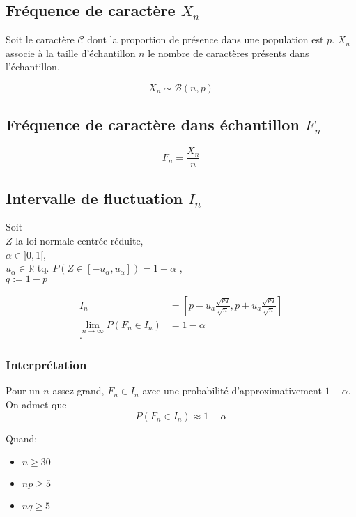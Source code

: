 \documentclass{article}
\newcommand{\R}{\mathds{R}}
\begin{document}
\subsection{Fréquence de caractère $X_{n}$}
Soit le caractère $\mathcal{C}$ dont la proportion de présence dans une population est $p$.
$X_{n}$ associe à la taille d'échantillon $n$ le nombre de caractères présents dans l'échantillon.

\[
	X_{n} \sim \mathcal{B}(n, p) 
\]

\subsection{Fréquence de caractère dans échantillon $F_{n}$}

\[
	F_{n} = \frac{X_{n}}{n}
\]

\subsection{Intervalle de fluctuation $I_n$}

Soit \\ $Z$ la loi normale centrée réduite, \\
$\alpha \in ]0, 1[$, \\
$u_{\alpha} \in \R$ tq. $P(Z \in [-u_{\alpha}, u_{\alpha}]) = 1 - \alpha$ ,\\
$q := 1-p$

\begin{align*}
	I_n &= \left[ p - u_{a} \frac{\sqrt{pq} }{\sqrt{n} }, p+u_{a} \frac{\sqrt{pq} }{\sqrt{n} } \right]  \\
	\lim_{n \to \infty} P(F_{n} \in I_{n}) &= 1 - \alpha \\
.\end{align*}


\subsubsection{Interprétation}

Pour un $n$ assez grand, $F_n \in I_n$ avec une probabilité d'approximativement $1 - \alpha$.
On admet que \[
	P(F_n \in I_n) \approx 1-\alpha
\] 

Quand:
\begin{itemize}
	\item $n \ge 30$
	\item $n p \ge 5$ 
	\item $n q \ge 5$
\end{itemize}
\end{document}
